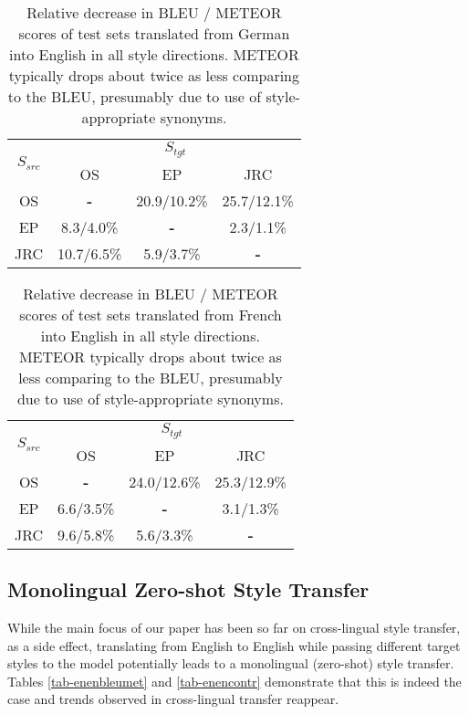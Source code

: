 \documentclass[11pt,a4paper]{article}
\begin{document}
\begin{table}[]
\centering
\begin{tabular}{|c|c|c|c|}
\hline
\multirow{2}{*}{$S_{src}$} & \multicolumn{3}{c|}{$S_{tgt}$}                                  \\ \cline{2-4} 
                              & OS                   & EP                   & JRC                  \\ \hline
OS                            & \textbf{-} & 20.9/10.2\%          & 25.7/12.1\%          \\ \hline
EP                            & 8.3/4.0\%          & \textbf{-} & 2.3/1.1\%          \\ \hline
JRC                           & 10.7/6.5\%          & 5.9/3.7\%          & \textbf{-} \\ \hline
\end{tabular}
\caption{\small Relative decrease in BLEU / METEOR scores of test sets translated from German into English in all style directions. METEOR typically drops about twice as less comparing to the BLEU, presumably due to use of style-appropriate synonyms.
      }
\label{tab-deenbleumet-perc}
\end{table}

\begin{table}[]
\centering
\begin{tabular}{|c|c|c|c|}
\hline
\multirow{2}{*}{$S_{src}$} & \multicolumn{3}{c|}{$S_{tgt}$}                                  \\ \cline{2-4} 
                              & OS                   & EP                   & JRC                  \\ \hline
OS                            & \textbf{-} & 24.0/12.6\%          & 25.3/12.9\%          \\ \hline
EP                            & 6.6/3.5\%          & \textbf{-} & 3.1/1.3\%        \\ \hline
JRC                           & 9.6/5.8\%          & 5.6/3.3\%          & \textbf{-} \\ \hline
\end{tabular}
\caption{\small Relative decrease in BLEU / METEOR scores of test sets translated from French into English in all style directions. METEOR typically drops about twice as less comparing to the BLEU, presumably due to use of style-appropriate synonyms.
      }
\label{tab-frenbleumet-perc}
\end{table}

\subsection{Monolingual Zero-shot Style Transfer}
While the main focus of our paper has been so far on cross-lingual style transfer, as a side effect, translating from English to English while passing different target styles to the model potentially leads to a monolingual (zero-shot) style transfer. Tables \ref{tab-enenbleumet} and \ref{tab-enencontr} demonstrate that this is indeed the case and trends observed in cross-lingual transfer reappear.
\end{document}
